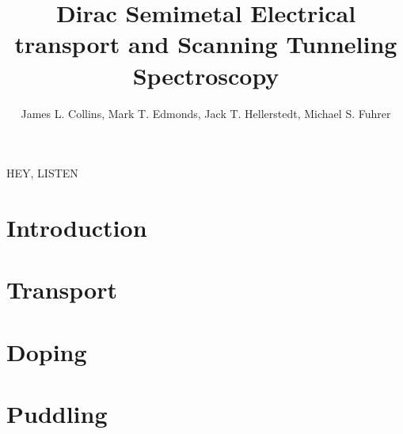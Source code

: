 \documentclass[]{book}
\author{James L. Collins, Mark T. Edmonds, Jack T. Hellerstedt, Michael S. Fuhrer}\title{Dirac Semimetal Electrical transport and Scanning Tunneling Spectroscopy}
\begin{document}
\frontmatter
%
\tableofcontents


\mainmatter

HEY, LISTEN




\section{Introduction} %
\label{sec:introduction}






\section{Transport} %
\label{sec:transport}







\section{Doping} %
\label{sec:doping}






\section{Puddling} %
\label{sec:puddling}







%



%
\backmatter
%
\end{document}
